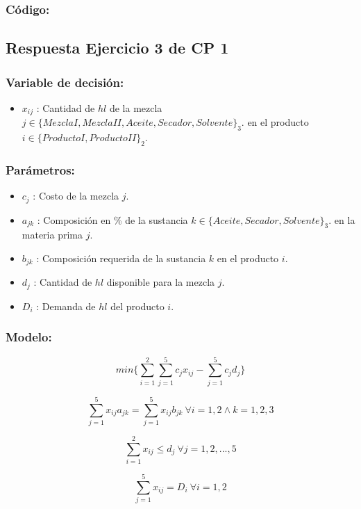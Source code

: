 \documentclass[]{article}
\begin{document}
\subsubsection*{C\'odigo:}


\subsection*{Respuesta Ejercicio 3 de CP 1}

\subsubsection*{Variable de decisi\'on:}

\begin{itemize}
	\item $x_{ij}$ : Cantidad de $hl$ de la mezcla $j \in \{Mezcla I,Mezcla II,Aceite,Secador,Solvente\}_3$. en el producto $i\in \{Producto I,Producto II\}_2$.
\end{itemize}

\subsubsection*{Par\'ametros:}
 
\begin{itemize}
	\item $c_j$ : Costo de la mezcla $j$.
	\item $a_{jk}$ : Composici\'on en \% de la sustancia $k \in \{Aceite,Secador,Solvente\}_3.$ en la materia prima $j$.
	\item $b_{jk}$ : Composici\'on requerida de la sustancia $k$ en el producto $i$.
	\item $d_j$ : Cantidad de $hl$ disponible para la mezcla $j$.
	\item $D_i$ : Demanda de $hl$ del producto $i$.
\end{itemize}

\subsubsection*{Modelo:}

$$ min \{ \sum_{i = 1}^2 \sum_{j = 1}^5 c_j x_{ij} -  \sum_{j=1}^5 c_j d_j\}$$

$$ \sum_{j=1}^5 x_{ij} a_{jk} = \sum_{j=1}^5 x_{ij} b_{jk}\ \forall i=1, 2 \land k = 1, 2, 3 $$

$$ \sum_{i=1}^2 x_{ij} \leq d_j\ \forall j = 1, 2, ..., 5 $$

$$ \sum_{j = 1}^5 x_{ij} = D_i\  \forall i=1, 2 $$
\end{document}
